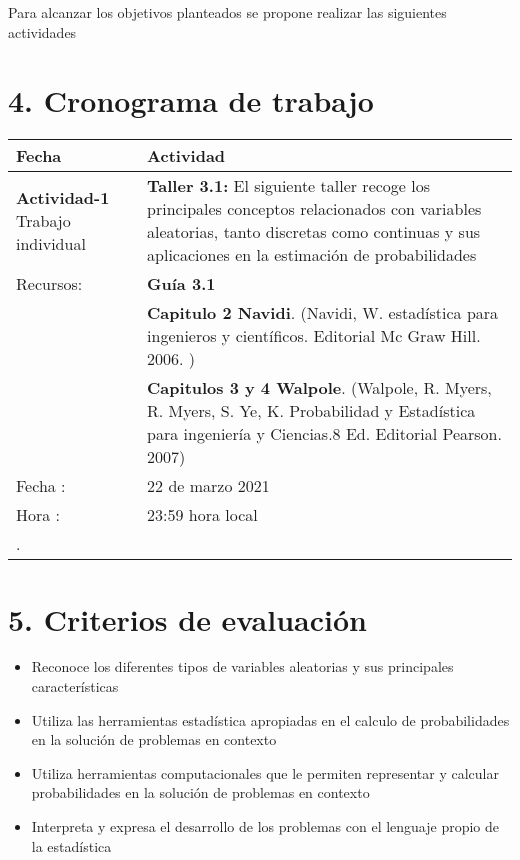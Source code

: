 \documentclass[base=hide,11pt]{elegantbook}
\begin{document}
Para alcanzar los objetivos planteados se propone realizar las siguientes actividades
% 	
\section*{4. Cronograma de trabajo}


\begin{tabular}{p{4cm}p{10cm}}
\hline	
Fecha                   & Actividad	\\
\hline 	
{\bf Actividad-1} \hspace{2cm} Trabajo individual           &
\textcolor{col1}{\bf Taller 3.1:} El siguiente taller recoge los principales conceptos relacionados con variables aleatorias, tanto discretas como continuas y sus aplicaciones en la estimación de probabilidades \\
Recursos: & {\bf Guía 3.1} \\
          & {\bf Capitulo  2 Navidi}.  (Navidi, W. estadística para ingenieros y científicos. Editorial Mc Graw Hill. 2006. )\\
          & {\bf Capitulos  3 y 4 Walpole}. (Walpole, R. Myers, R. Myers, S. Ye, K. Probabilidad y Estadística para ingeniería y Ciencias.8 Ed. Editorial Pearson. 2007)\\
Fecha  : & 22 de marzo 2021\\
Hora   : & 23:59 hora local \\
\hline 


.


\end{tabular}
\section*{5. Criterios de evaluación}

\begin{itemize}
	\item Reconoce los diferentes tipos de variables aleatorias y sus principales características 
	\item Utiliza las herramientas estadística apropiadas en el calculo de probabilidades en la solución de problemas en contexto
	\item Utiliza herramientas computacionales que le permiten representar y calcular probabilidades en la solución de problemas en contexto
	\item Interpreta y expresa el desarrollo de los problemas con el lenguaje propio de la estadística
\end{itemize}
\end{document}
